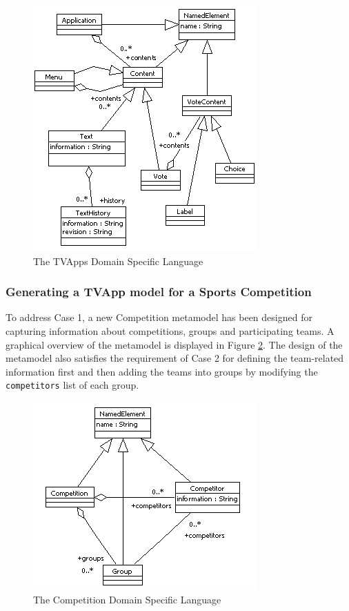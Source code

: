 \begin{figure}
	\centering
		\includegraphics{images/TVApps}
	\caption{The TVApps Domain Specific Language}
	\label{fig:TVApps}
\end{figure}

\subsubsection{Generating a TVApp model for a Sports Competition}
\label{sec:Competition}

To address Case 1, a new Competition metamodel has been designed for capturing information about competitions, groups and participating teams. A graphical overview of the metamodel is displayed in Figure \ref{fig:Competition}. The design of the metamodel also satisfies the requirement of Case 2 for defining the team-related information first and then adding the teams into groups by modifying the \texttt{competitors} list of each group.

\begin{figure}
	\centering
		\includegraphics{images/Competition}
	\caption{The Competition Domain Specific Language}
	\label{fig:Competition}
\end{figure}

